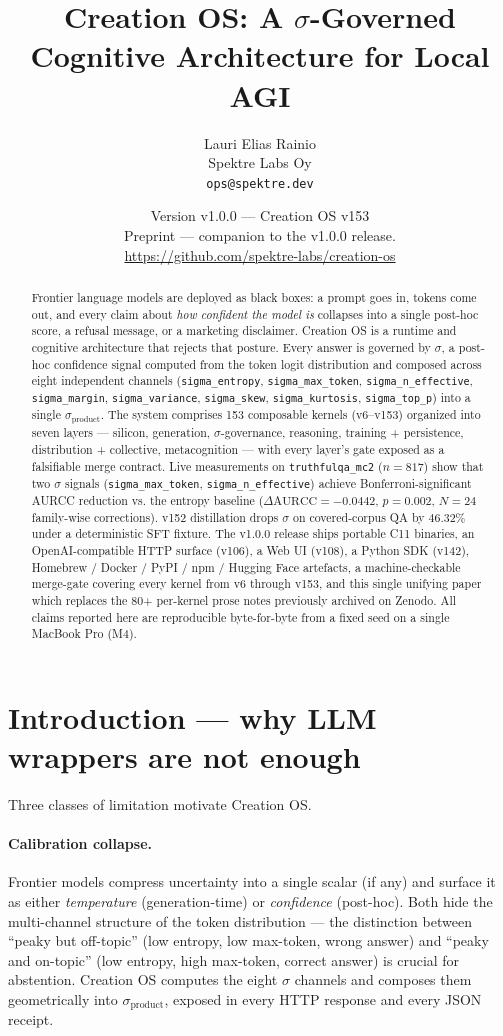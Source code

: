 \documentclass[11pt,letterpaper]{article}
\title{Creation OS: A $\sigma$-Governed Cognitive Architecture for Local AGI}
\author{%
  Lauri Elias Rainio\\
  Spektre Labs Oy\\
  \texttt{ops@spektre.dev}%
}
\date{Version v1.0.0 --- Creation OS v153\\
      Preprint --- companion to the v1.0.0 release.\\
      \url{https://github.com/spektre-labs/creation-os}}
\newcommand{\sigprod}{\sigma_{\mathrm{product}}}
\newcommand{\code}[1]{\texttt{#1}}
\begin{document}
\maketitle

\begin{abstract}
Frontier language models are deployed as black boxes: a prompt goes
in, tokens come out, and every claim about \emph{how confident the
model is} collapses into a single post-hoc score, a refusal
message, or a marketing disclaimer. Creation OS is a runtime and
cognitive architecture that rejects that posture. Every answer is
governed by $\sigma$, a post-hoc confidence signal computed from
the token logit distribution and composed across eight independent
channels (\code{sigma\_entropy}, \code{sigma\_max\_token},
\code{sigma\_n\_effective}, \code{sigma\_margin},
\code{sigma\_variance}, \code{sigma\_skew},
\code{sigma\_kurtosis}, \code{sigma\_top\_p}) into a single
$\sigprod$. The system comprises 153 composable kernels
(v6--v153) organized into seven layers --- silicon, generation,
$\sigma$-governance, reasoning, training + persistence,
distribution + collective, metacognition --- with every layer's
gate exposed as a falsifiable merge contract. Live measurements on
\code{truthfulqa\_mc2} ($n=817$) show that two $\sigma$ signals
(\code{sigma\_max\_token}, \code{sigma\_n\_effective}) achieve
Bonferroni-significant AURCC reduction vs. the entropy baseline
($\Delta\mathrm{AURCC} = -0.0442$, $p = 0.002$, $N=24$
family-wise corrections). v152 distillation drops $\sigma$ on
covered-corpus QA by $46.32\%$ under a deterministic SFT fixture.
The v1.0.0 release ships portable C11 binaries, an
OpenAI-compatible HTTP surface (v106), a Web UI (v108), a Python
SDK (v142), Homebrew / Docker / PyPI / npm / Hugging Face
artefacts, a machine-checkable merge-gate covering every kernel
from v6 through v153, and this single unifying paper which
replaces the 80+ per-kernel prose notes previously archived on
Zenodo. All claims reported here are reproducible byte-for-byte
from a fixed seed on a single MacBook Pro (M4).
\end{abstract}

\section{Introduction --- why LLM wrappers are not enough}

Three classes of limitation motivate Creation OS.

\paragraph{Calibration collapse.} Frontier models compress
uncertainty into a single scalar (if any) and surface it as either
\emph{temperature} (generation-time) or \emph{confidence}
(post-hoc). Both hide the multi-channel structure of the token
distribution --- the distinction between ``peaky but off-topic''
(low entropy, low max-token, wrong answer) and ``peaky and
on-topic'' (low entropy, high max-token, correct answer) is
crucial for abstention. Creation OS computes the eight $\sigma$
channels and composes them geometrically into $\sigprod$, exposed
in every HTTP response and every JSON receipt.
\end{document}
